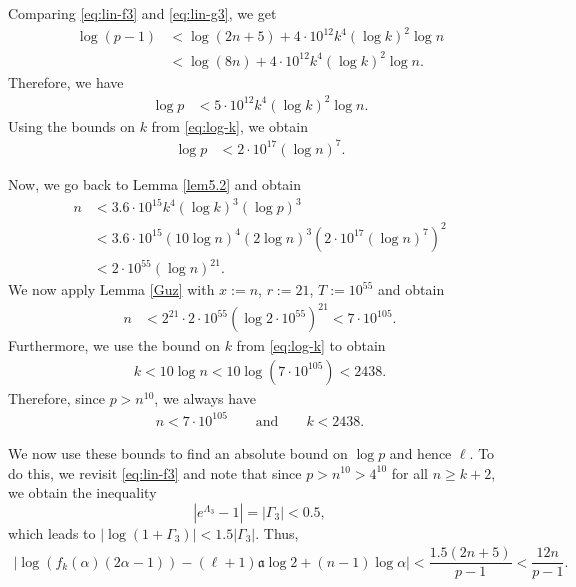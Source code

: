 \documentclass[11pt,a4paper]{article}
\numberwithin{equation}{section}
\numberwithin{table}{section}
\numberwithin{figure}{section}
\begin{document}
Comparing \eqref{eq:lin-f3} and \eqref{eq:lin-g3}, we get
\begin{align*}
	\log (p-1) &< \log(2n+5)+ 4\cdot 10^{12}k^4 (\log k)^2\log n\\
	&< \log(8n)+ 4\cdot 10^{12}k^4 (\log k)^2\log n.
\end{align*}
Therefore, we have 
\begin{align*}
	\log p &<  5\cdot 10^{12}k^4 (\log k)^2\log n.
\end{align*}
Using the bounds on $k$ from \eqref{eq:log-k}, we obtain 
\begin{align*}
	\log p &<  2\cdot 10^{17}(\log n)^7.
\end{align*}

Now, we go back to Lemma \ref{lem5.2} and obtain 
\begin{align*}
	n&<3.6\cdot 10^{15} k^{4}(\log k)^3 (\log p)^3 \\
	&<3.6\cdot 10^{15} (10\log n)^{4}(2\log n)^3 \left(2\cdot 10^{17}(\log n)^7\right)^2\\
	&< 2\cdot 10^{55} (\log n)^{21}.
\end{align*}
We now apply Lemma \ref{Guz} with  $x:=n$, $r:=21$, $T:=10^{55}$ and obtain
\begin{align*}
	n&<2^{21}\cdot2\cdot 10^{55} \left(\log2\cdot10^{55} \right)^{21} < 7 \cdot  10^{105}.
\end{align*}	
Furthermore, we use the bound on $k$ from \eqref{eq:log-k} to obtain 
\begin{align*}
	k < 10\log n < 10\log (7\cdot 10^{105}) < 2438.
\end{align*}
Therefore, since $p>n^{10}$, we always have 
\begin{align}\label{eq:nk2}
n< 7 \cdot  10^{105}\qquad\text{and} \qquad	k < 2438.
\end{align}


We now use these bounds to find an absolute bound on $\log p$ and hence $\ell$. To do this, we revisit \eqref{eq:lin-f3} and note that since $p> n^{10}>4^{10}$ for all $n\ge k+2$, we obtain the inequality  
\[
\left| e^{\Lambda_3} - 1 \right| = |\Gamma_3| < 0.5,
\]
which leads to $ |\log (1+\Gamma_3)| < 1.5|\Gamma_3|$. Thus,
\begin{align*}
	\left|  \log \left(f_k(\alpha)(2\alpha - 1)\right) - (\ell+1)\mathfrak{a} \log 2 +(n-1) \log \alpha  \right| < \dfrac{1.5(2n+5)}{p-1}<\dfrac{12n}{p-1}.
\end{align*}
\end{document}
